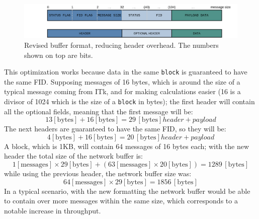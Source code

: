 \begin{figure}[htbp]
\centering
\includegraphics[width=\textwidth]{images/contributions/new-buffer-format.png}
\caption[New network buffer format]{Revised buffer format, reducing header overhead. The numbers shown on top are bits.}
\label{fig:new-buffer-format}
\end{figure}

This optimization works because data in the same \texttt{block} is guaranteed to have the same \acs{FID}.
Supposing messages of 16 bytes, which is around the size of a typical message coming from \acs{ITk}, and for making calculations easier (16 is a divisor of 1024 which is the size of a \texttt{block} in bytes); the first header will contain all the optional fields, meaning that the first message will be:
\[
13 [\text{bytes}] + 16 [\text{bytes}] = 29 \, [\text{bytes}]
    header        +      payload
\]
The next headers are guaranteed to have the same \acs{FID}, so they will be:
\[
4 [\text{bytes}] + 16 [\text{bytes}] = 20\, [\text{bytes}]
    header       +       payload
\]
A block, which is 1KB, will contain 64 messages of 16 bytes each; with the new header the total size of the network buffer is:
\[
1 [\text{messages}] \times 29 [\text{bytes}] + (63 [\text{messages}] \times 20 [\text{bytes}]) = 1289 \, [\text{bytes}]
\]
while using the previous header, the network buffer size was:
\[
64 [\text{messages}] \times 29 [\text{bytes}] = 1856\, [\text{bytes}]
\]
In a typical scenario, with the new formatting the network buffer would be able to contain over  more messages within the same size, which corresponds to a notable increase in throughput.